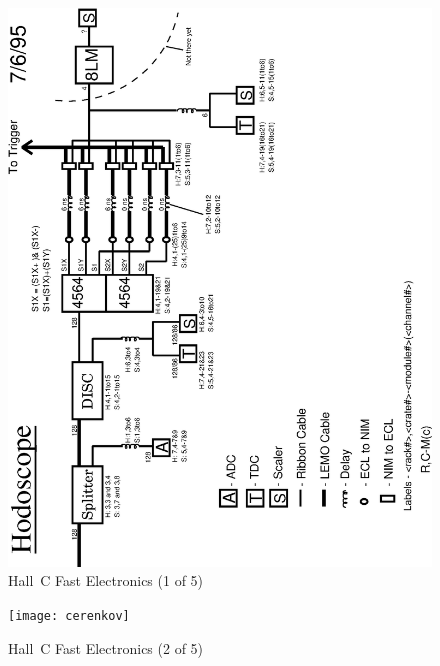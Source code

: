 \begin{figure}
\includegraphics[width=5.8in]{hodoscope}
\caption{Hall~C Fast Electronics (1 of 5) \label{fig:7.2}}
\end{figure}
\clearpage

\begin{figure}
\texttt{[image: cerenkov]}
\caption{Hall~C Fast Electronics (2 of 5) \label{fig:7.3}}
\end{figure}
\clearpage

